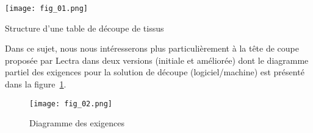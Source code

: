 \begin{marginfigure}
\texttt{[image: fig\_01.png]}
\caption{Structure d’une table de découpe de tissus \label{fig_01}}
\end{marginfigure}
	
Dans ce sujet, nous nous intéresserons plus particulièrement à la tête de coupe proposée par Lectra dans deux versions (initiale et améliorée) dont le diagramme partiel des exigences pour la solution de découpe (logiciel/machine) est présenté dans la figure~\ref{fig_02}.


\begin{figure}
\centering
\texttt{[image: fig\_02.png]}
\caption{Diagramme des exigences \label{fig_02}}
\end{figure}